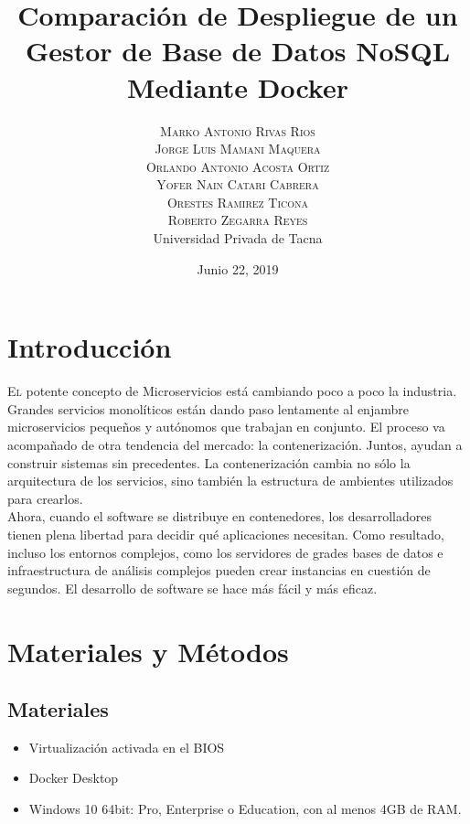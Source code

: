 \documentclass[twoside,onecolumn]{article}
\title{Comparación de Despliegue de un Gestor de Base de Datos NoSQL Mediante Docker} %
\author{%
\textsc{Marko Antonio Rivas Rios} \\[1ex] %
\textsc{Jorge Luis Mamani Maquera} \\[1.01ex] %
\textsc{Orlando Antonio Acosta Ortiz} \\[1.02ex] %
\textsc{Yofer Nain Catari Cabrera} \\[1.03ex] %
\textsc{Orestes Ramirez Ticona} \\[1.04ex] %
\textsc{Roberto Zegarra Reyes} \\[1.05ex] %
\normalsize Universidad Privada de Tacna \\  %
\normalsize {} %
}
\date{Junio 22, 2019} %
\begin{document}
\maketitle


\section{Introducción}

\lettrine[nindent=0em,lines=2]{E}l potente concepto de Microservicios está cambiando poco a poco la industria. Grandes servicios monolíticos están dando paso lentamente al enjambre microservicios pequeños y autónomos que trabajan en conjunto. El proceso va acompañado de otra tendencia del mercado: la contenerización. Juntos, ayudan a construir sistemas  sin precedentes. La contenerización cambia no sólo la arquitectura de los servicios, sino también la estructura de ambientes utilizados para crearlos.
\textbf{}\\
Ahora, cuando el software se distribuye en contenedores, los desarrolladores tienen plena libertad para decidir qué aplicaciones necesitan. Como resultado, incluso los entornos complejos, como los servidores de grades bases de datos e infraestructura de análisis complejos pueden crear instancias en cuestión de segundos. El desarrollo de software se hace más fácil y más eficaz.

\section{Materiales y Métodos}
\subsection{Materiales}
	\begin{itemize}
		\item Virtualización activada en el BIOS
		\item Docker Desktop
		\item Windows 10 64bit: Pro, Enterprise o Education, con al menos 4GB de RAM.
	\end{itemize}
\end{document}
